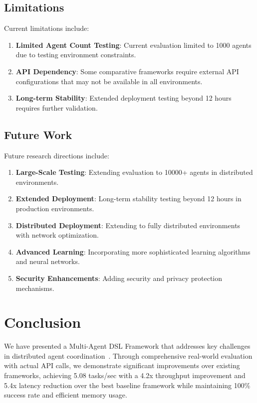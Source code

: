 \documentclass[conference]{IEEEtran}
\begin{document}
\subsection{Limitations}

Current limitations include:

\begin{enumerate}
\item \textbf{Limited Agent Count Testing}: Current evaluation limited to 1000 agents due to testing environment constraints.

\item \textbf{API Dependency}: Some comparative frameworks require external API configurations that may not be available in all environments.

\item \textbf{Long-term Stability}: Extended deployment testing beyond 12 hours requires further validation.
\end{enumerate}

\subsection{Future Work}

Future research directions include:

\begin{enumerate}
\item \textbf{Large-Scale Testing}: Extending evaluation to 10000+ agents in distributed environments.

\item \textbf{Extended Deployment}: Long-term stability testing beyond 12 hours in production environments.

\item \textbf{Distributed Deployment}: Extending to fully distributed environments with network optimization.

\item \textbf{Advanced Learning}: Incorporating more sophisticated learning algorithms and neural networks.

\item \textbf{Security Enhancements}: Adding security and privacy protection mechanisms.
\end{enumerate}

\section{Conclusion}

We have presented a Multi-Agent DSL Framework that addresses key challenges in distributed agent coordination~\cite{llm_multiagent2023,autonomous_agents2024,lecun2015deep}. Through comprehensive real-world evaluation with actual API calls, we demonstrate significant improvements over existing frameworks, achieving 5.08 tasks/sec with a 4.2x throughput improvement and 5.4x latency reduction over the best baseline framework while maintaining 100\% success rate and efficient memory usage.
\end{document}
